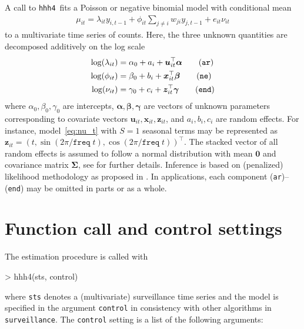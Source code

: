 \documentclass[a4paper,11pt]{article}
\newcommand{\surveillance}{\texttt{surveillance}}
\newcommand{\code}[1]{\texttt{#1}}
\newcommand{\hhh}{\texttt{hhh4}}
\begin{document}
A call to \hhh\ fits a Poisson or negative binomial model with conditional
mean
\begin{align*}
  \mu_{it} = \lambda_{it} y_{i,t-1} + \phi_{it} \sum_{j\neq i} w_{ji} y_{j,t-1} +e_{it} \nu_{it}
\end{align*}
to a multivariate time series of counts.
Here, the three unknown quantities are decomposed additively on the log scale
\begin{align}
  \log(\lambda_{it}) &= \alpha_0 + a_i +\bm{u}_{it}^\top \bm{\alpha} \tag{\code{ar}}\\
  \log(\phi_{it}) &=  \beta_0 + b_i +\bm{x}_{it}^\top \bm{\beta} \tag{\code{ne}}\\
  \log(\nu_{it}) &=  \gamma_0 + c_i +\bm{z}_{it}^\top \bm{\gamma}\tag{\code{end}}
\end{align}
where $\alpha_0,\beta_0,\gamma_0$ are intercepts, $\bm{\alpha},\bm{\beta},\bm{\gamma}$
are vectors of unknown parameters corresponding to covariate vectors 
$\bm{u}_{it},\bm{x}_{it},\bm{z}_{it}$, and $a_i,b_i,c_i$ are random effects. 
For instance, model~\eqref{eq:nu_t} with $S=1$ seasonal terms may be
represented as $\bm{z}_{it}=(t,\sin(2\pi/\code{freq}\;t),\cos(2\pi/\code{freq}\;t))^\top$.
The stacked vector of all random effects
is assumed to follow a normal distribution with mean $\bm{0}$ and covariance
matrix $\bm{\Sigma}$, see \cite{paul-held-2010} for further details.
Inference is based on (penalized) likelihood methodology as proposed in 
\cite{paul-held-2010}. In applications, each component (\code{ar})--(\code{end}) 
may be omitted in parts or as a whole.


\section{Function call and control settings}\label{sec:hhh}

The estimation procedure is called with
\begin{Schunk}
\begin{Sinput}
> hhh4(sts, control)
\end{Sinput}
\end{Schunk}
where \code{sts} denotes a (multivariate) surveillance time series and
the model is specified in the argument \code{control} in consistency
with other algorithms in \surveillance.
The \code{control} setting is a list of the following arguments:
\end{document}
